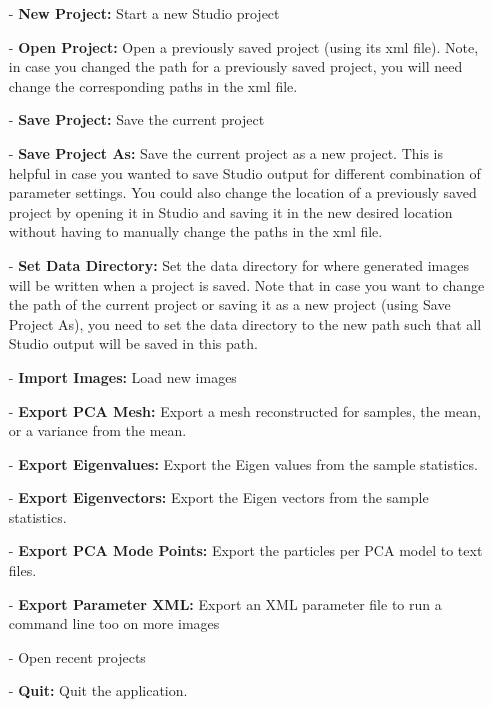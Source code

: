 \documentclass[letterpaper,12pt]{article}   %
\begin{document}
\begin{itemize}
 	\item[-] \textbf{New Project:} Start a new Studio project
 	\item[-] \textbf{Open Project:} Open a previously saved project (using its xml file). Note, in case you changed the path for a previously saved project, you will need change the corresponding paths in the xml file.
	\item[-] \textbf{Save Project:} Save the current project
	\item[-] \textbf{Save Project As:} Save the current project as a new project. This is helpful in case you wanted to save Studio output for different combination of parameter settings. You could also change the location of a previously saved project by opening it in Studio and saving it in the new desired location without having to manually change the paths in the xml file.
	
	\item[-] \textbf{Set Data Directory:} Set the data directory for where generated images will be written when a project is saved. Note that in case you want to change the path of the current project or saving it as a new project (using Save Project As), you need to set the data directory to the new path such that all Studio output will be saved in this path.
	
	\item[-] \textbf{Import Images:} Load new images
	\item[-] \textbf{Export PCA Mesh:} Export a mesh reconstructed for samples, the mean, or a variance from the mean.
	\item[-] \textbf{Export Eigenvalues:} Export the Eigen values from the sample statistics.
	\item[-] \textbf{Export Eigenvectors:} Export the Eigen vectors from the sample statistics.
	\item[-] \textbf{Export PCA Mode Points:} Export the particles per PCA model to text files.
	\item[-] \textbf{Export Parameter XML:} Export an XML parameter file to run a command line too on more images
	\item[-] Open recent projects
	\item[-] \textbf{Quit:} Quit the application. 
\end{itemize}
\end{document}
